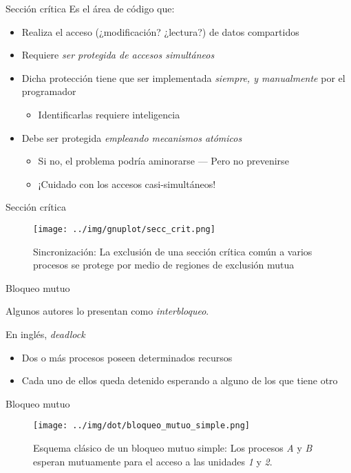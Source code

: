\documentclass[presentation]{beamer}
\begin{document}
\begin{frame}[label={sec:org0279b8a}]{Sección crítica}
Es el área de código que:
\begin{itemize}
\item Realiza el acceso (¿modificación? ¿lectura?) de datos compartidos
\item Requiere \emph{ser protegida de accesos simultáneos}
\item Dicha protección tiene que ser implementada \emph{siempre, y
manualmente} por el programador
\begin{itemize}
\item Identificarlas requiere inteligencia
\end{itemize}
\item Debe ser protegida \emph{empleando mecanismos atómicos}
\begin{itemize}
\item Si no, el problema podría aminorarse — Pero no prevenirse
\item ¡Cuidado con los accesos casi-simultáneos!
\end{itemize}
\end{itemize}
\end{frame}

\begin{frame}[label={sec:orgad137ee}]{Sección crítica}
\begin{figure}[htbp]
\centering
\texttt{[image: ../img/gnuplot/secc\_crit.png]}
\caption{Sincronización: La exclusión de una sección crítica común a varios procesos se protege por medio de regiones de exclusión mutua}
\end{figure}
\end{frame}

\begin{frame}[label={sec:orgcfd5c51}]{Bloqueo mutuo}
\begin{center}
Algunos autores lo presentan como \emph{interbloqueo}.

En inglés, \emph{deadlock}
\end{center}
\begin{itemize}
\item Dos o más procesos poseen determinados recursos
\item Cada uno de ellos queda detenido esperando a alguno de los que tiene
otro
\end{itemize}
\end{frame}

\begin{frame}[label={sec:orgb53f111}]{Bloqueo mutuo}
\begin{figure}[htbp]
\centering
\texttt{[image: ../img/dot/bloqueo\_mutuo\_simple.png]}
\caption{Esquema clásico de un bloqueo mutuo simple: Los procesos \emph{A} y \emph{B} esperan mutuamente para el acceso a las unidades \emph{1} y \emph{2}.}
\end{figure}
\end{frame}
\end{document}
